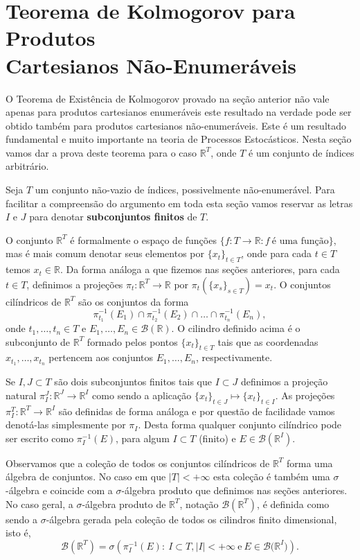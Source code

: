 \section[Teorema de Kolmogorov para Produtos Cartesianos Não-Enumeráveis]
{Teorema de Kolmogorov para Produtos \\Cartesianos Não-Enumeráveis}

O Teorema de Existência de Kolmogorov 
provado na seção anterior não vale apenas
para produtos cartesianos enumeráveis este resultado na verdade
pode ser obtido também para produtos
cartesianos não-enumeráveis. Este é um resultado fundamental e muito 
importante na teoria de Processos Estocásticos. Nesta seção 
vamos dar a prova deste teorema para o caso $\mathbb{R}^T$,
onde $T$ é um conjunto de índices arbitrário. 


Seja $T$ um conjunto não-vazio de índices, possivelmente não-enumerável.
Para facilitar a compreensão do argumento em toda esta seção vamos
reservar as letras $I$ e $J$ para denotar 
{\bf subconjuntos finitos}  de $T$.

O conjunto $\mathbb{R}^T$ é formalmente o espaço de funções 
$\{f:T\to\mathbb{R}: f\ \text{é uma função}\}$, 
mas é mais comum denotar seus elementos por $\{x_t\}_{t\in T}$,
onde para cada $t\in T$ temos $x_t\in\mathbb{R}$.
Da forma análoga a que fizemos nas seções anteriores,
para cada $t\in T$, 
definimos a projeções $\pi_t:\mathbb{R}^{T}\to\mathbb{R}$
por $\pi_t(\{x_s\}_{s\in T})=x_t$. O conjuntos cilíndricos 
de $\mathbb{R}^T$ são os conjuntos da forma 
\[
\pi^{-1}_{t_1}(E_1)
\cap 
\pi^{-1}_{t_2}(E_2)
\cap \ldots
\cap
\pi^{-1}_{t_n}(E_n),
\]
onde $t_1,\ldots, t_n\in T$ e $E_1,\ldots,E_n\in\mathscr{B}(\mathbb{R})$.
O cilindro definido acima é o subconjunto de $\mathbb{R}^T$ 
formado pelos pontos $\{x_t\}_{t\in T}$ tais que 
as coordenadas $x_{t_1},\ldots,x_{t_n}$ pertencem aos
conjuntos $E_1,\ldots,E_n$, respectivamente.


Se $I,J\subset T$ são dois subconjuntos finitos tais que 
$I\subset J$ definimos a projeção natural
$\pi^{J}_{I}:\mathbb{R}^J\to\mathbb{R}^I$ como 
sendo a aplicação $\{x_t\}_{t\in J}\mapsto \{x_t\}_{t\in I}$.  
As projeções $\pi^{T}_{I}:\mathbb{R}^T\to\mathbb{R}^I$
são definidas de forma análoga e por questão de facilidade
vamos denotá-las simplesmente por $\pi_I$.
Desta forma qualquer conjunto cilíndrico pode ser escrito 
como $\pi^{-1}_I(E)$, para algum $I\subset T$ (finito) e
$E\in \mathscr{B}(\mathbb{R}^{I})$.


Observamos que a coleção de todos os conjuntos cilíndricos
de $\mathbb{R}^T$ forma uma álgebra de conjuntos. No caso 
em que $|T|<+\infty$ esta coleção é também uma $\sigma$-álgebra
e coincide com a $\sigma$-álgebra produto que definimos nas 
seções anteriores. 
No caso geral, a $\sigma$-álgebra produto de $\mathbb{R}^T$,
notação $\mathscr{B}(\mathbb{R}^T)$,
é definida como sendo a $\sigma$-álgebra gerada pela 
coleção de todos os cilindros finito dimensional, isto é,
\[
\mathscr{B}(\mathbb{R}^T)
=
\sigma\left(
\pi^{-1}_{I}(E):
\ I\subset T, |I|<+\infty \ 
\text{e}\ 
E\in\mathscr{B}\big(\mathbb{R}^I\big)
\right).
\] 



